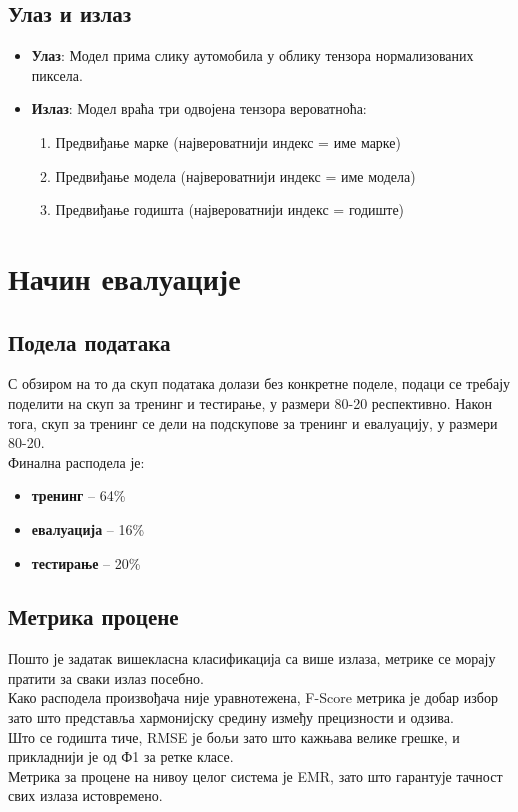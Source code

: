 \documentclass{article}
\begin{document}
  \subsection*{Улаз и излаз}
  \begin{itemize}
    \item \textbf{Улаз}: Модел прима слику аутомобила у облику тензора нормализованих пиксела.
    \item \textbf{Излаз}: Модел враћа три одвојена тензора вероватноћа:
    \begin{enumerate}
        \item Предвиђање марке (највероватнији индекс = име марке)
        \item Предвиђање модела (највероватнији индекс = име модела)
        \item Предвиђање годишта (највероватнији индекс = годиште)
    \end{enumerate}
  \end{itemize}
  \section{Начин евалуације}
  \subsection*{Подела података}
  С обзиром на то да скуп података долази без конкретне поделе, подаци се требају поделити на скуп за тренинг и тестирање, у размери 80-20 респективно. Након тога, скуп за тренинг се дели на подскупове за тренинг и евалуацију, у размери 80-20. \\ 
  Финална расподела је:
  \begin{itemize}
    \item \textbf{тренинг} -- 64\%
    \item \textbf{евалуација} -- 16\%
    \item \textbf{тестирање} -- 20\%
  \end{itemize}
  \subsection*{Метрика процене}
  Пошто је задатак вишекласна класификација са више излаза, метрике се морају пратити за сваки излаз посебно. \\
  Како расподела произвођача није уравнотежена, F-Score метрика је добар избор зато што представља хармонијску средину између прецизности и одзива. \\ 
  Што се годишта тиче, RMSE је бољи зато што кажњава велике грешке, и прикладнији је од Ф1 за ретке класе. \\
  Метрика за процене на нивоу целог система је EMR, зато што гарантује тачност свих излаза истовремено.
\end{document}
